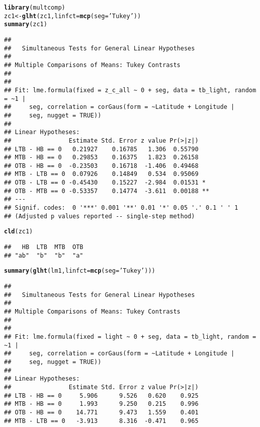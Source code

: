 \documentclass[letterpaper,12pt]{article}\usepackage[]{graphicx}\usepackage[]{color}
\makeatletter
\newcommand{\hlstr}[1]{\textcolor[rgb]{0.192,0.494,0.8}{#1}}%
\newcommand{\hlstd}[1]{\textcolor[rgb]{0.345,0.345,0.345}{#1}}%
\newcommand{\hlkwb}[1]{\textcolor[rgb]{0.69,0.353,0.396}{#1}}%
\newcommand{\hlkwc}[1]{\textcolor[rgb]{0.333,0.667,0.333}{#1}}%
\newcommand{\hlkwd}[1]{\textcolor[rgb]{0.737,0.353,0.396}{\textbf{#1}}}%
\newenvironment{kframe}{%
 \def\at@end@of@kframe{}%
 \ifinner\ifhmode%
  \def\at@end@of@kframe{\end{minipage}}%
  \begin{minipage}{\columnwidth}%
 \fi\fi%
 \def\FrameCommand##1{\hskip\@totalleftmargin \hskip-\fboxsep
 \colorbox{shadecolor}{##1}\hskip-\fboxsep
     \hskip-\linewidth \hskip-\@totalleftmargin \hskip\columnwidth}%
 \MakeFramed {\advance\hsize-\width
   \@totalleftmargin\z@ \linewidth\hsize
   \@setminipage}}%
 {\par\unskip\endMakeFramed%
 \at@end@of@kframe}
\newenvironment{knitrout}{}{} %
\makeatother
\begin{document}
\clearpage
\begin{knitrout}
\color{fgcolor}\begin{kframe}
\begin{alltt}
\hlkwd{library}\hlstd{(multcomp)}
\hlstd{zc1} \hlkwb{<-} \hlkwd{glht}\hlstd{(zc1,} \hlkwc{linfct} \hlstd{=} \hlkwd{mcp}\hlstd{(}\hlkwc{seg} \hlstd{=} \hlstr{'Tukey'}\hlstd{))}
\hlkwd{summary}\hlstd{(zc1)}
\end{alltt}
\begin{verbatim}
## 
## 	 Simultaneous Tests for General Linear Hypotheses
## 
## Multiple Comparisons of Means: Tukey Contrasts
## 
## 
## Fit: lme.formula(fixed = z_c_all ~ 0 + seg, data = tb_light, random = ~1 | 
##     seg, correlation = corGaus(form = ~Latitude + Longitude | 
##     seg, nugget = TRUE))
## 
## Linear Hypotheses:
##                Estimate Std. Error z value Pr(>|z|)   
## LTB - HB == 0   0.21927    0.16785   1.306  0.55790   
## MTB - HB == 0   0.29853    0.16375   1.823  0.26158   
## OTB - HB == 0  -0.23503    0.16718  -1.406  0.49468   
## MTB - LTB == 0  0.07926    0.14849   0.534  0.95069   
## OTB - LTB == 0 -0.45430    0.15227  -2.984  0.01531 * 
## OTB - MTB == 0 -0.53357    0.14774  -3.611  0.00188 **
## ---
## Signif. codes:  0 '***' 0.001 '**' 0.01 '*' 0.05 '.' 0.1 ' ' 1
## (Adjusted p values reported -- single-step method)
\end{verbatim}
\begin{alltt}
\hlkwd{cld}\hlstd{(zc1)}
\end{alltt}
\begin{verbatim}
##   HB  LTB  MTB  OTB 
## "ab"  "b"  "b"  "a"
\end{verbatim}
\begin{alltt}
\hlkwd{summary}\hlstd{(}\hlkwd{glht}\hlstd{(lm1,} \hlkwc{linfct} \hlstd{=} \hlkwd{mcp}\hlstd{(}\hlkwc{seg} \hlstd{=} \hlstr{'Tukey'}\hlstd{)))}
\end{alltt}
\begin{verbatim}
## 
## 	 Simultaneous Tests for General Linear Hypotheses
## 
## Multiple Comparisons of Means: Tukey Contrasts
## 
## 
## Fit: lme.formula(fixed = light ~ 0 + seg, data = tb_light, random = ~1 | 
##     seg, correlation = corGaus(form = ~Latitude + Longitude | 
##     seg, nugget = TRUE))
## 
## Linear Hypotheses:
##                Estimate Std. Error z value Pr(>|z|)
## LTB - HB == 0     5.906      9.526   0.620    0.925
## MTB - HB == 0     1.993      9.250   0.215    0.996
## OTB - HB == 0    14.771      9.473   1.559    0.401
## MTB - LTB == 0   -3.913      8.316  -0.471    0.965

\end{verbatim}
\end{kframe}
\end{knitrout}
\end{document}
